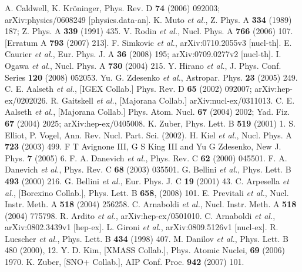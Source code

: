 \begin{thebibliography}{99}
A. Caldwell, K. Kr\"oninger, Phys. Rev. D \textbf{74} (2006) 092003; arXiv:physics/0608249 [physics.data-an].
K. Muto \textit{et al.}, Z. Phys. A \textbf{334} (1989) 187; Z. Phys. A \textbf{339} (1991) 435.
V. Rodin \textit{et al.}, Nucl. Phys. A \textbf{766} (2006) 107. [Erratum A \textbf{793} (2007) 213].
F. Simkovic \textit{et al.}, arXiv:0710.2055v3 [nucl-th].
E. Caurier \textit{et al.}, Eur. Phys. J. A \textbf{36} (2008) 195; arXiv:0709.0277v2 [nucl-th].
I. Ogawa \textit{et al.}, Nucl. Phys. A \textbf{730} (2004) 215.
Y. Hirano \textit{et al.}, J. Phys. Conf. Series \textbf{120} (2008) 052053.
Yu. G. Zdesenko \textit{et al.}, Astropar. Phys. \textbf{23} (2005) 249.
C. E. Aalseth \textit{et al.}, [IGEX Collab.] Phys. Rev. D \textbf{65} (2002) 092007; arXiv:hep-ex/0202026.
R. Gaitskell \textit{et al.}, [Majorana Collab.] arXiv:nucl-ex/0311013.
C. E. Aalseth \textit{et al.}, [Majorana Collab.] Phys. Atom. Nucl. \textbf{67} (2004) 2002; Yad. Fiz. \textbf{67} (2004) 2025; arXiv:hep-ex/0405008.
K. Zuber, Phys. Lett. B \textbf{519} (2001) 1.
S. Elliot, P. Vogel, Ann. Rev. Nucl. Part. Sci. (2002).
H. Kiel \textit{et al.}, Nucl. Phys. A \textbf{723} (2003) 499.
F T Avignone III, G S King III and Yu G Zdesenko, New J. Phys. \textbf{7} (2005) 6.
F. A. Danevich \textit{et al.}, Phys. Rev. C \textbf{62} (2000) 045501.
F. A. Danevich \textit{et al.}, Phys. Rev. C \textbf{68} (2003) 035501.
G. Bellini \textit{et al.}, Phys. Lett. B \textbf{493} (2000) 216.
G. Bellini \textit{et al.}, Eur. Phys. J. C \textbf{19} (2001) 43.
C. Arpesella \textit{et al.}, [Borexino Collab.], Phys. Lett. B \textbf{658}, (2008) 101.
E. Previtali \textit{et al.}, Nucl. Instr. Meth. A \textbf{518} (2004) 256258.
C. Arnaboldi \textit{et al.}, Nucl. Instr. Meth. A \textbf{518} (2004) 775798.
R. Ardito \textit{et al.}, arXiv:hep-ex/0501010.
C. Arnaboldi \textit{et al.}, arXiv:0802.3439v1 [hep-ex].
L. Gironi \textit{et al.}, arXiv:0809.5126v1 [nucl-ex].
R. Luescher \textit{et al.}, Phys. Lett. B \textbf{434} (1998) 407.
M. Danilov \textit{et al.}, Phys. Lett. B 480 (2000), 12.
Y. D. Kim, [XMASS Collab.], Phys. Atomic Nuclei, \textbf{69} (2006) 1970.
K. Zuber, [SNO+ Collab.], AIP Conf. Proc. \textbf{942} (2007) 101.

\end{thebibliography}
